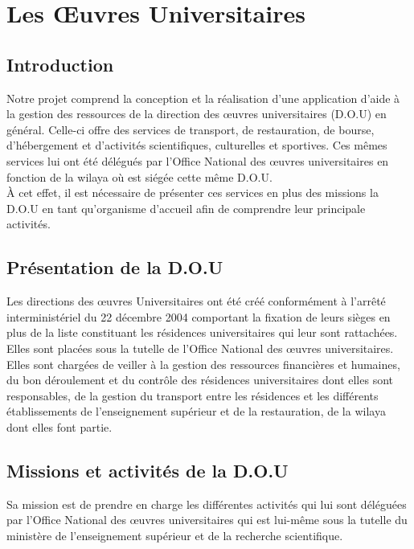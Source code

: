 \chapter{Les Œuvres Universitaires}

\section{Introduction}
    Notre projet comprend la conception et la réalisation d'une application d'aide à la gestion des ressources de la direction des œuvres universitaires (D.O.U) en général. Celle-ci offre des services de transport, de restauration, de bourse, d'hébergement et d'activités scientifiques, culturelles et sportives. Ces mêmes services lui ont été délégués par l'Office National des œuvres universitaires en fonction de la wilaya où est siégée cette même \acs{D.O.U}.\\
    
    À cet effet, il est nécessaire de présenter ces services en plus des missions la \acs{D.O.U} en tant qu'organisme d'accueil afin de comprendre leur principale activités.\\

\section{Présentation de la \acs{D.O.U} \cite{dou}}
    Les directions des œuvres Universitaires ont été créé conformément à l'arrêté interministériel du 22 décembre 2004 comportant la fixation de leurs sièges en plus de la liste constituant les résidences universitaires qui leur sont rattachées. Elles sont placées sous la tutelle de l'Office National des œuvres universitaires.\\

    Elles sont chargées de veiller à la gestion des ressources financières et humaines, du bon déroulement et du contrôle des résidences universitaires dont elles sont responsables, de la gestion du transport entre les résidences et les différents établissements de l'enseignement supérieur et de la restauration, de la wilaya dont elles font partie.\\

\section{Missions et activités de la \acs{D.O.U} \cite{onou-arrete}}
    Sa mission est de prendre en charge les différentes activités qui lui sont déléguées par l'Office National des œuvres universitaires qui est lui-même sous la tutelle du ministère de l'enseignement supérieur et de la recherche scientifique.\\
    
